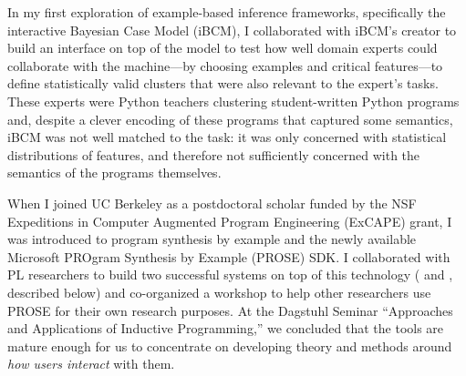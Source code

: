 \documentclass[justified]{tufte-handout}
\begin{document}
In my first exploration of example-based inference frameworks, specifically the interactive Bayesian Case Model (iBCM),
I collaborated with iBCM's creator to build an interface on top of the model to test how well domain experts could collaborate with the machine---by choosing examples and critical features---to define statistically valid clusters that were also relevant to the expert's tasks.\cite{tr15} These experts were Python teachers clustering student-written Python programs and, despite a clever encoding of these programs that captured some semantics, iBCM was not well matched to the task: it was only concerned with statistical distributions of features, and therefore not sufficiently concerned with the semantics of the programs themselves. 

When I joined UC Berkeley as a postdoctoral scholar funded by the NSF Expeditions in Computer Augmented Program Engineering (ExCAPE) grant, I was introduced to program synthesis by example and the newly available Microsoft PROgram Synthesis by Example (PROSE) SDK. I collaborated with PL researchers to build two successful systems on top of this technology ( and , described below) and co-organized a workshop to help other researchers use PROSE for their own research purposes. At the Dagstuhl Seminar ``Approaches and Applications of Inductive Programming,'' we concluded that the tools are mature enough for us to concentrate on developing theory and methods around \emph{how users interact} with them.
\\


\end{document}
